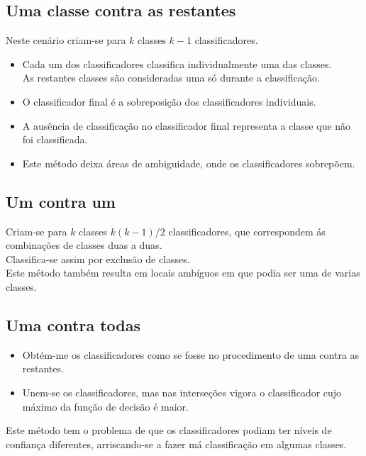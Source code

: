 \documentclass[]{report}
\begin{document}
\subsection{Uma classe contra as restantes}
Neste cenário criam-se para $k$ classes $k-1$ classificadores.
\begin{itemize}
\item Cada um dos classificadores classifica individualmente uma das classes.\\
As restantes classes são consideradas uma só durante a classificação.
\item O classificador final é a sobreposição dos classificadores individuais.
\item A ausência de classificação no classificador final representa a classe que não foi classificada.
\item Este método deixa áreas de ambiguidade, onde os classificadores sobrepõem.
\end{itemize}
\subsection{Um contra um}
Criam-se para $k$ classes $k(k-1)/2$ classificadores, que correspondem ás combinações de classes duas a duas.\\
Classifica-se assim por exclusão de classes.\\
Este método também resulta em locais ambíguos em que podia ser uma de varias classes.
\subsection{Uma contra todas}
\begin{itemize}
\item Obtém-me os classificadores como se fosse no procedimento de uma contra as restantes.
\item Unem-se os classificadores, mas nas interseções vigora o classificador cujo máximo da função de decisão é maior.
\end{itemize}
Este método tem o problema de que os classificadores podiam ter níveis de confiança diferentes, arriscando-se a fazer má classificação em algumas classes.
\end{document}
